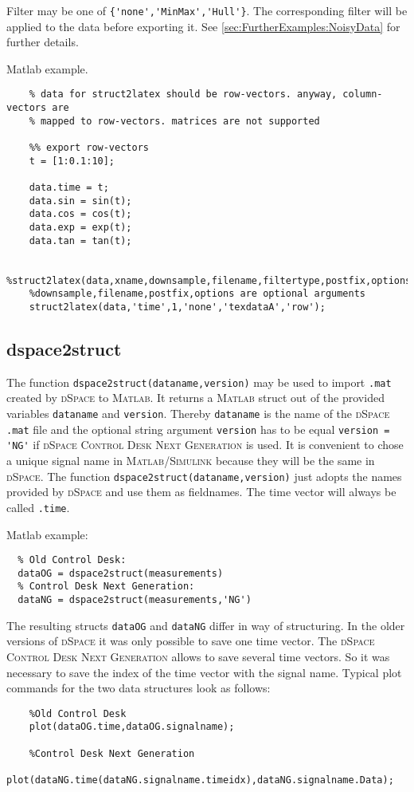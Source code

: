 Filter may be one of \verb+{'none','MinMax','Hull'}+. The corresponding
filter will be applied to the data before exporting it. See
\ref{sec:FurtherExamples:NoisyData} for further details.

Matlab example.
\begin{verbatim}
    % data for struct2latex should be row-vectors. anyway, column-vectors are
    % mapped to row-vectors. matrices are not supported

    %% export row-vectors
    t = [1:0.1:10];

    data.time = t;
    data.sin = sin(t);
    data.cos = cos(t);
    data.exp = exp(t);
    data.tan = tan(t);

    %struct2latex(data,xname,downsample,filename,filtertype,postfix,options)
    %downsample,filename,postfix,options are optional arguments
    struct2latex(data,'time',1,'none','texdataA','row');
\end{verbatim}

\subsection{dspace2struct}
The function \texttt{dspace2struct(dataname,version)} may be used to import
\texttt{.mat} created by \textsc{dSpace} to \textsc{Matlab}. It returns a
\textsc{Matlab} struct out of the provided variables \verb+dataname+ and
\verb+version+. Thereby \verb+dataname+ is the name of the \textsc{dSpace}
\verb+.mat+ file and the optional string argument \verb+version+ has to be equal
\verb+version = 'NG'+ if \textsc{dSpace Control Desk Next Generation} is used.
It is convenient to chose a unique signal name in \textsc{Matlab/Simulink}
because they will be the same in \textsc{dSpace}. The function
\texttt{dspace2struct(dataname,version)} just adopts the names provided by
\textsc{dSpace} and use them as fieldnames. The time vector will always be
called \verb+.time+.

Matlab example:
\begin{verbatim}
  % Old Control Desk:
  dataOG = dspace2struct(measurements)
  % Control Desk Next Generation:
  dataNG = dspace2struct(measurements,'NG')
\end{verbatim}

The resulting structs \verb+dataOG+ and \verb+dataNG+ differ in way of
structuring. In the older versions of \textsc{dSpace} it was only possible to
save one time vector. The \textsc{dSpace Control Desk Next Generation} allows to
save several time vectors. So it was necessary to save the index of the time
vector with the signal name. Typical plot commands for the two data structures
look as follows:
\begin{verbatim}
	%Old Control Desk
	plot(dataOG.time,dataOG.signalname);
	
	%Control Desk Next Generation
	plot(dataNG.time(dataNG.signalname.timeidx),dataNG.signalname.Data);
\end{verbatim} 
